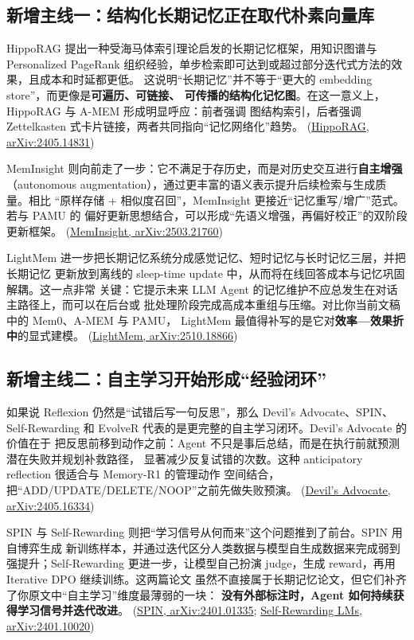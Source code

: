 \documentclass[11pt,a4paper]{article}
\begin{document}
\subsection{新增主线一：结构化长期记忆正在取代朴素向量库}

HippoRAG 提出一种受海马体索引理论启发的长期记忆框架，用知识图谱与 Personalized
PageRank 组织经验，单步检索即可达到或超过部分迭代式方法的效果，且成本和时延都更低。
这说明“长期记忆”并不等于“更大的 embedding store”，而更像是\textbf{可遍历、可链接、
可传播的结构化记忆图}。在这一意义上，HippoRAG 与 A-MEM 形成明显呼应：前者强调
图结构索引，后者强调 Zettelkasten 式卡片链接，两者共同指向“记忆网络化”趋势。
\hfill(\href{https://arxiv.org/abs/2405.14831}{HippoRAG, arXiv:2405.14831})

MemInsight 则向前走了一步：它不满足于存历史，而是对历史交互进行\textbf{自主增强}
（autonomous augmentation），通过更丰富的语义表示提升后续检索与生成质量。相比
“原样存储 + 相似度召回”，MemInsight 更接近“记忆重写/增广”范式。若与 PAMU 的
偏好更新思想结合，可以形成“先语义增强，再偏好校正”的双阶段更新框架。
\hfill(\href{https://arxiv.org/abs/2503.21760}{MemInsight, arXiv:2503.21760})

LightMem 进一步把长期记忆系统分成感觉记忆、短时记忆与长时记忆三层，并把长期记忆
更新放到离线的 sleep-time update 中，从而将在线回答成本与记忆巩固解耦。这一点非常
关键：它提示未来 LLM Agent 的记忆维护不应总发生在对话主路径上，而可以在后台或
批处理阶段完成高成本重组与压缩。对比你当前文稿中的 Mem0、A-MEM 与 PAMU，
LightMem 最值得补写的是它对\textbf{效率—效果折中}的显式建模。
\hfill(\href{https://arxiv.org/abs/2510.18866}{LightMem, arXiv:2510.18866})

\subsection{新增主线二：自主学习开始形成“经验闭环”}

如果说 Reflexion 仍然是“试错后写一句反思”，那么 Devil's Advocate、SPIN、
Self-Rewarding 和 EvolveR 代表的是更完整的自主学习闭环。Devil's Advocate 的价值在于
把反思前移到动作之前：Agent 不只是事后总结，而是在执行前就预测潜在失败并规划补救路径，
显著减少反复试错的次数。这种 anticipatory reflection 很适合与 Memory-R1 的管理动作
空间结合，把“ADD/UPDATE/DELETE/NOOP”之前先做失败预演。
\hfill(\href{https://arxiv.org/abs/2405.16334}{Devil's Advocate, arXiv:2405.16334})

SPIN 与 Self-Rewarding 则把“学习信号从何而来”这个问题推到了前台。SPIN 用自博弈生成
新训练样本，并通过迭代区分人类数据与模型自生成数据来完成弱到强提升；Self-Rewarding
更进一步，让模型自己扮演 judge，生成 reward，再用 Iterative DPO 继续训练。这两篇论文
虽然不直接属于长期记忆论文，但它们补齐了你原文中“自主学习”维度最薄弱的一块：\textbf{
没有外部标注时，Agent 如何持续获得学习信号并迭代改进}。
\hfill(\href{https://arxiv.org/abs/2401.01335}{SPIN, arXiv:2401.01335};
\href{https://arxiv.org/abs/2401.10020}{Self-Rewarding LMs, arXiv:2401.10020})
\end{document}

